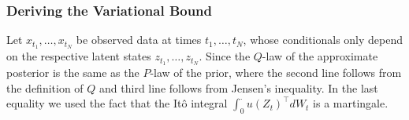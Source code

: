 \documentclass[twoside]{article}
\begin{document}
\subsubsection{Deriving the Variational Bound}
Let $x_{t_1}, \dots, x_{t_N}$ be observed data at times $t_1, \dots, t_N$, whose conditionals only depend on the respective latent states $z_{t_1}, \dots, z_{t_N}$. 
Since the $Q$-law of the approximate posterior is the same as the $P$-law of the prior,
where the second line follows from the definition of $Q$ and third line follows from Jensen's inequality. In the last equality we used the fact that the It\^{o} integral $\int_0^{\cdot} u(Z_t)^{\top} dW_t$ is a martingale.
\end{document}
